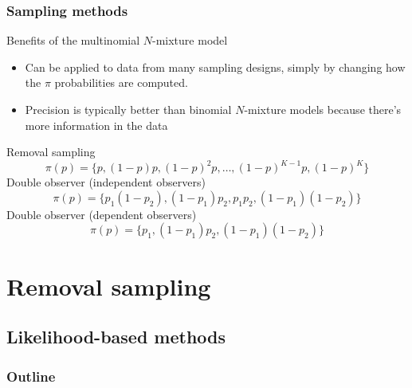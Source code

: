 \documentclass[color=usenames,dvipsnames]{beamer}\usepackage[]{graphicx}\usepackage[]{color}
\begin{document}
\begin{frame}
  \frametitle{Sampling methods}
  Benefits of the multinomial $N$-mixture model
  \begin{itemize}
    \item Can be applied to data from many sampling designs, simply by
      changing how the $\pi$ probabilities are computed. %
    \item Precision is typically better than binomial $N$-mixture
      models because there's more information in the data
  \end{itemize}
  \pause
  \vfill
  Removal sampling %
  \[
    {\pi(p)} = \{p, (1-p)p, (1-p)^2p, \dots, (1-p)^{K-1}p, (1-p)^K\}
  \]
  \pause %
  Double observer (\alert{independent observers})
  \[
    {\pi(p)} = \{p_1(1-p_2), (1-p_1)p_2, p_1p_2, (1-p_1)(1-p_2)\}
  \]
  \pause %
  Double observer (\alert{dependent observers})
  \[
    {\pi(p)} = \{p_1, (1-p_1)p_2, (1-p_1)(1-p_2)\}
  \]
\end{frame}













\section{Removal sampling}

\subsection{Likelihood-based methods}

\begin{frame}
  \frametitle{Outline}
  \Large
  \tableofcontents[currentsection]
\end{frame}
\end{document}
